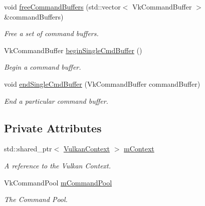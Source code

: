 \begin{DoxyCompactItemize}
void \mbox{\hyperlink{class_command_pool_a556f939f99a7044cc9e3292750c8a749}{free\+Command\+Buffers}} (std\+::vector$<$ Vk\+Command\+Buffer $>$ \&command\+Buffers)
\begin{DoxyCompactList}\small\item\em Free a set of command buffers. \end{DoxyCompactList}\item 
\mbox{\label{class_command_pool_ae34747d50dac1595c05a32ecea3c29c8}} 
Vk\+Command\+Buffer \mbox{\hyperlink{class_command_pool_ae34747d50dac1595c05a32ecea3c29c8}{begin\+Single\+Cmd\+Buffer}} ()
\begin{DoxyCompactList}\small\item\em Begin a command buffer. \end{DoxyCompactList}\item 
\mbox{\label{class_command_pool_a8f22c52f4ce80bd907091158d1c15fe2}} 
void \mbox{\hyperlink{class_command_pool_a8f22c52f4ce80bd907091158d1c15fe2}{end\+Single\+Cmd\+Buffer}} (Vk\+Command\+Buffer command\+Buffer)
\begin{DoxyCompactList}\small\item\em End a particular command buffer. \end{DoxyCompactList}\end{DoxyCompactItemize}
\subsection*{Private Attributes}
\begin{DoxyCompactItemize}
\item 
\mbox{\label{class_command_pool_ab772a0899158511042d5d6a66bc0f8e6}} 
std\+::shared\+\_\+ptr$<$ \mbox{\hyperlink{class_vulkan_context}{Vulkan\+Context}} $>$ \mbox{\hyperlink{class_command_pool_ab772a0899158511042d5d6a66bc0f8e6}{m\+Context}}
\begin{DoxyCompactList}\small\item\em A reference to the Vulkan Context. \end{DoxyCompactList}\item 
\mbox{\label{class_command_pool_abbc29e014077eb50d066364ac376ef96}} 
Vk\+Command\+Pool \mbox{\hyperlink{class_command_pool_abbc29e014077eb50d066364ac376ef96}{m\+Command\+Pool}}
\begin{DoxyCompactList}\small\item\em The Command Pool. \end{DoxyCompactList}\end{DoxyCompactItemize}


